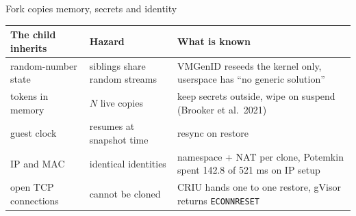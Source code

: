 \begin{frame}[t]{\ev{\tagO}Fork copies memory, secrets and identity}
\vspace{0pt}
{\small
\begin{tabularx}{\textwidth}{@{}L{2.7cm}L{3.3cm}Y@{}}
\toprule
The child inherits & Hazard & What is known\\
\midrule
random-number state & siblings share random streams & VMGenID reseeds the kernel only, userspace has ``no generic solution''\\
tokens in memory & $N$ live copies & keep secrets outside, wipe on suspend (Brooker et al.\ 2021)\\
guest clock & resumes at snapshot time & resync on restore\\
IP and MAC & identical identities & namespace + NAT per clone, Potemkin spent 142.8 of 521 ms on IP setup\\
open TCP connections & cannot be cloned & CRIU hands one to one restore, gVisor returns \texttt{ECONNRESET}\\
\bottomrule
\end{tabularx}\par}
\end{frame}
